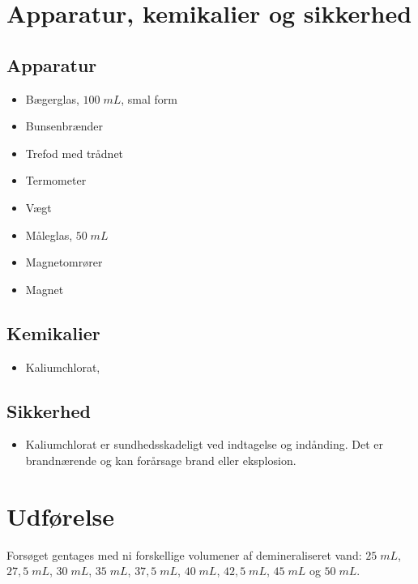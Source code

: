 \documentclass{report}
\begin{document}
\section*{Apparatur, kemikalier og sikkerhed}
\subsection*{Apparatur}
\begin{itemize}
  \item Bægerglas, $100 \;\unit{mL} $, smal form
  \item Bunsenbrænder
  \item Trefod med trådnet
  \item Termometer
  \item Vægt
  \item Måleglas, $50 \;\unit{mL} $
  \item Magnetomrører
  \item Magnet
\end{itemize}
\subsection*{Kemikalier}
\begin{itemize}
  \item Kaliumchlorat,   
\end{itemize}
\subsection*{Sikkerhed}
\begin{itemize}
  \item Kaliumchlorat er sundhedsskadeligt ved indtagelse og indånding. Det er brandnærende og kan forårsage brand eller eksplosion.
\end{itemize}

\section*{Udførelse}
Forsøget gentages med ni forskellige volumener af demineraliseret vand: $25 \;\unit{mL} $, $27,5 \;\unit{mL} $, $30 \;\unit{mL} $, $35 \;\unit{mL} $, $37,5 \;\unit{mL} $, $40 \;\unit{mL}  $, $42,5 \;\unit{mL}  $, $45 \;\unit{mL} $ og $50 \;\unit{mL} $.
\end{document}

